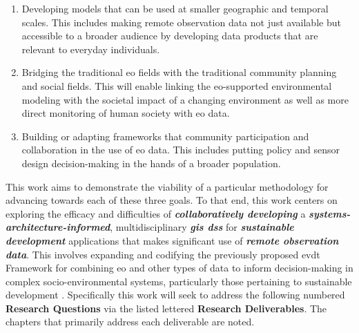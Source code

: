 \begin{enumerate}[label=\emph{\alph*},itemsep=0pt,parsep=0pt]
	\item{Developing models that can be used at smaller geographic and temporal scales. This includes making remote observation data not just available but accessible to a broader audience by developing data products that are relevant to everyday individuals.}
	\item{Bridging the traditional \ac{eo} fields with the traditional community planning and social fields. This will enable linking the \ac{eo}-supported environmental modeling with the societal impact of a changing environment as well as more direct monitoring of human society with \ac{eo} data.}
	\item{Building or adapting frameworks that community participation and collaboration in the use of \ac{eo} data. This includes putting policy and sensor design decision-making in the hands of a broader population.}
\end{enumerate}

This work aims to demonstrate the viability of a particular methodology for advancing towards each of these three goals. To that end, this work centers on exploring the efficacy and difficulties of \textbf{\textit{collaboratively developing}} a \textbf{\textit{systems-architecture-informed}}, multidisciplinary \textbf{\textit{\ac{gis} \ac{dss}}} for \textbf{\textit{sustainable development}} applications that makes significant use of \textbf{\textit{remote observation data}}. This involves expanding and codifying the previously proposed \acf{evdt} Framework  for combining \ac{eo} and other types of data to inform decision-making in complex socio-environmental systems, particularly those pertaining to sustainable development \cite{reidCombiningSocialEnvironmental2019}. Specifically this work will seek to address the following numbered \textbf{Research Questions} via the listed lettered \textbf{Research Deliverables}. The chapters that primarily address each deliverable are noted.


